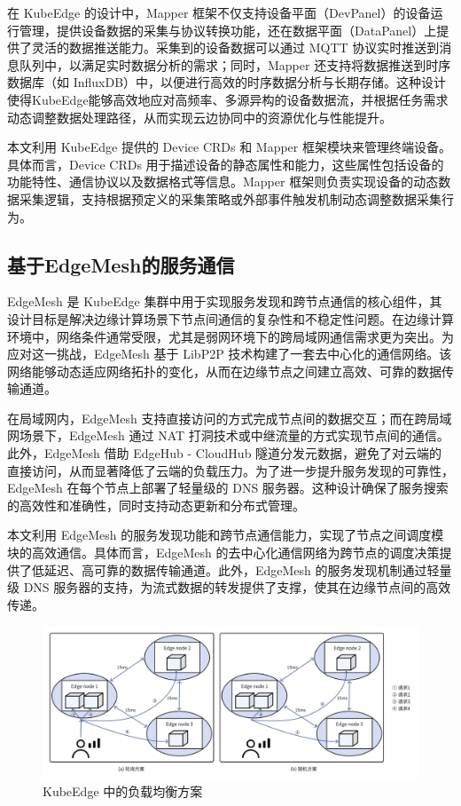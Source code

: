在 KubeEdge 的设计中，Mapper 框架不仅支持设备平面（DevPanel）的设备运行管理，提供设备数据的采集与协议转换功能，还在数据平面（DataPanel）上提供了灵活的数据推送能力。采集到的设备数据可以通过 MQTT 协议实时推送到消息队列中，以满足实时数据分析的需求；同时，Mapper 还支持将数据推送到时序数据库（如 InfluxDB）中，以便进行高效的时序数据分析与长期存储。这种设计使得KubeEdge能够高效地应对高频率、多源异构的设备数据流，并根据任务需求动态调整数据处理路径，从而实现云边协同中的资源优化与性能提升。

本文利用 KubeEdge 提供的 Device CRDs 和 Mapper 框架模块来管理终端设备。具体而言，Device CRDs 用于描述设备的静态属性和能力，这些属性包括设备的功能特性、通信协议以及数据格式等信息。Mapper 框架则负责实现设备的动态数据采集逻辑，支持根据预定义的采集策略或外部事件触发机制动态调整数据采集行为。

\subsection{基于EdgeMesh的服务通信}

EdgeMesh 是 KubeEdge 集群中用于实现服务发现和跨节点通信的核心组件，其设计目标是解决边缘计算场景下节点间通信的复杂性和不稳定性问题。在边缘计算环境中，网络条件通常受限，尤其是弱网环境下的跨局域网通信需求更为突出。为应对这一挑战，EdgeMesh 基于 LibP2P 技术构建了一套去中心化的通信网络。该网络能够动态适应网络拓扑的变化，从而在边缘节点之间建立高效、可靠的数据传输通道。

在局域网内，EdgeMesh 支持直接访问的方式完成节点间的数据交互；而在跨局域网场景下，EdgeMesh 通过 NAT 打洞技术或中继流量的方式实现节点间的通信。此外，EdgeMesh 借助 EdgeHub - CloudHub 隧道分发元数据，避免了对云端的直接访问，从而显著降低了云端的负载压力。为了进一步提升服务发现的可靠性，EdgeMesh 在每个节点上部署了轻量级的 DNS 服务器。这种设计确保了服务搜索的高效性和准确性，同时支持动态更新和分布式管理。

本文利用 EdgeMesh 的服务发现功能和跨节点通信能力，实现了节点之间调度模块的高效通信。具体而言，EdgeMesh 的去中心化通信网络为跨节点的调度决策提供了低延迟、高可靠的数据传输通道。此外，EdgeMesh 的服务发现机制通过轻量级 DNS 服务器的支持，为流式数据的转发提供了支撑，使其在边缘节点间的高效传递。

\begin{figure}[ht]
  \centering
  \includegraphics[width=\linewidth]{pics/4-3edgemesh.png}
  \caption{KubeEdge 中的负载均衡方案}
  \label{fig:4-3edgemesh}
\end{figure}


